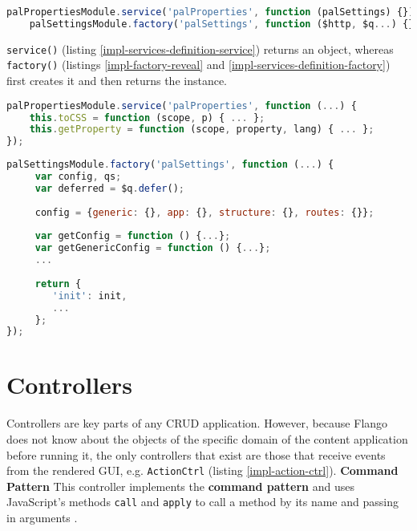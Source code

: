 \begin{lstlisting}[language=JavaScript,caption=Examples of services definition, label=impl-services-definition]
    palPropertiesModule.service('palProperties', function (palSettings) {});
    palSettingsModule.factory('palSettings', function ($http, $q...) {});
\end{lstlisting}




\texttt{service()} (listing \ref{impl-services-definition-service}) returns an object, whereas \texttt{factory()}  (listings \ref{impl-factory-reveal} and \ref{impl-services-definition-factory}) first creates it and then returns the instance.

\begin{lstlisting}[language=JavaScript,caption=Examples of services definition (service()), label=impl-services-definition-service]
palPropertiesModule.service('palProperties', function (...) {
    this.toCSS = function (scope, p) { ... };
    this.getProperty = function (scope, property, lang) { ... };
});
\end{lstlisting}

\begin{lstlisting}[language=JavaScript,caption=Examples of services definition (factory()), label=impl-services-definition-factory]
palSettingsModule.factory('palSettings', function (...) {
     var config, qs;
     var deferred = $q.defer();
     
     config = {generic: {}, app: {}, structure: {}, routes: {}};
     
     var getConfig = function () {...};
     var getGenericConfig = function () {...};
     ...
     
     return {
        'init': init,
        ...
     };
});
\end{lstlisting}

\section{Controllers}
\label{sec:controllers}
Controllers are key parts of any \ac{CRUD} application.
However, because Flango \cm does not know about the objects of the specific domain  of the content application before running it, the only controllers that exist are those that receive events from the rendered \ac{GUI}, e.g. \texttt{ActionCtrl} (listing \ref{impl-action-ctrl}).
\textbf{Command Pattern} This controller implements the \textbf{command pattern} and uses JavaScript's methods \texttt{call} and \texttt{apply} to call a method by its name and passing in arguments \cite{Osmani:2012}.

